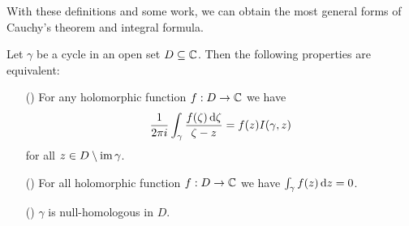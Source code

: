 With these definitions and some work, we can obtain the most general forms of Cauchy's theorem and integral formula.
\begin{theorem}\label{Cauchy integral theorem general form}
Let $\gamma$ be a cycle in an open set $D\subseteq\mathbb{C}$. Then the
following properties are equivalent:
\begin{itemize}
\item[(\rmnum{1})] For any holomorphic function $f:D\to\mathbb{C}$ we have
\[\frac{1}{2\pi i}\int_{\gamma}\frac{f(\zeta)\mathop{}\!\mathrm{d}\zeta}{\zeta-z}=f(z)I(\gamma,z)\]
for all $z\in D\setminus\mathrm{im}\,\gamma$. 
\item[(\rmnum{2})] For all holomorphic function $f:D\to\mathbb{C}$ we have $\int_{\gamma}f(z)\mathop{}\!\mathrm{d} z=0$.
\item[(\rmnum{3})] $\gamma$ is null-homologous in $D$.
\end{itemize}
\end{theorem}
